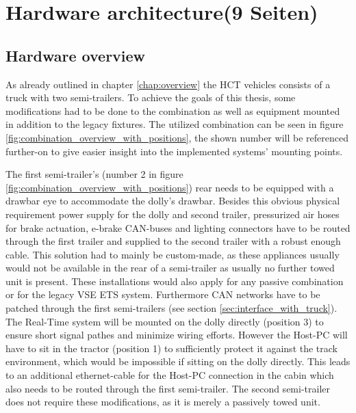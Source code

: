 \documentclass[ExampleMasters.tex]{subfiles}
\begin{document}
\clearpage


\chapter{Hardware architecture(9 Seiten)}
\label{chap:hardware_setup}

\section{Hardware overview}

As already outlined in chapter \ref{chap:overview} the HCT vehicles consists of a truck with two semi-trailers. To achieve the goals of this thesis, some modifications had to be done to the combination as well as equipment mounted in addition to the legacy fixtures. The utilized combination can be seen in figure \ref{fig:combination_overview_with_positions}, the shown number will be referenced further-on to give easier insight into the implemented systems' mounting points.


The first semi-trailer's (number 2 in figure \ref{fig:combination_overview_with_positions}) rear needs to be equipped with a drawbar eye to accommodate the dolly's drawbar. Besides this obvious physical requirement power supply for the dolly and second trailer, pressurized air hoses for brake actuation, e-brake CAN-buses and lighting connectors have to be routed through the first trailer and supplied to the second trailer with a robust enough cable. This solution had to mainly be custom-made, as these appliances usually would not be available in the rear of a semi-trailer as usually no further towed unit is present. These installations would also apply for any passive combination or for the legacy VSE ETS system. Furthermore CAN networks have to be patched through the first semi-trailers (see section \ref{sec:interface_with_truck}). The Real-Time system will be mounted on the dolly directly (position 3) to ensure short signal pathes and minimize wiring efforts. However the Host-PC will have to sit in the tractor (position 1) to sufficiently protect it against the track environment, which would be impossible if sitting on the dolly directly. This leads to an additional ethernet-cable for the Host-PC connection in the cabin which also needs to be routed through the first semi-trailer. The second semi-trailer does not require these modifications, as it is merely a passively towed unit.
\end{document}
